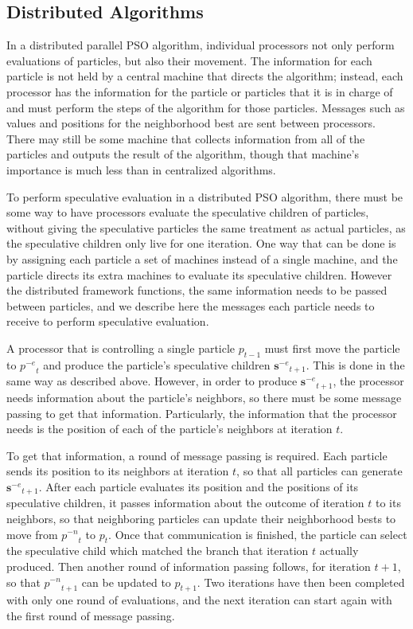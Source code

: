\documentclass[oneside,honors]{honors}
\providecommand{\noeval}[1]{\ensuremath{#1^{-e}}}
\providecommand{\nonbest}[1]{\ensuremath{#1^{-n}}}
\providecommand{\p}{\ensuremath{p}}
\providecommand{\sset}{\ensuremath{\mathbf{s}}}
\begin{document}
\subsection{Distributed Algorithms}

In a distributed parallel PSO algorithm, individual processors not only perform
evaluations of particles, but also their movement.  The information for each
particle is not held by a central machine that directs the algorithm; instead,
each processor has the information for the particle or particles that it is in
charge of and must perform the steps of the algorithm for those particles.
Messages such as values and positions for the neighborhood best are sent
between processors.  There may still be some machine that collects information
from all of the particles and outputs the result of the algorithm, though that
machine's importance is much less than in centralized algorithms.

To perform speculative evaluation in a distributed PSO algorithm, there must be
some way to have processors evaluate the speculative children of particles,
without giving the speculative particles the same treatment as actual
particles, as the speculative children only live for one iteration.  One way
that can be done is by assigning each particle a set of machines instead of a
single machine, and the particle directs its extra machines to evaluate its
speculative children.  However the distributed framework functions, the same
information needs to be passed between particles, and we describe here the
messages each particle needs to receive to perform speculative evaluation.

A processor that is controlling a single particle $\p_{t-1}$ must first move
the particle to $\noeval{\p}_t$ and produce the particle's speculative children
$\noeval{\sset}_{t+1}$.  This is done in the same way as described above.
However, in order to produce $\noeval{\sset}_{t+1}$, the processor needs
information about the particle's neighbors, so there must be some message
passing to get that information.  Particularly, the information that the
processor needs is the position of each of the particle's neighbors at
iteration $t$.

To get that information, a round of message passing is required.  Each particle
sends its position to its neighbors at iteration $t$, so that all particles can
generate $\noeval{\sset}_{t+1}$.  After each particle evaluates its position
and the positions of its speculative children, it passes information about the
outcome of iteration $t$ to its neighbors, so that neighboring particles can
update their neighborhood bests to move from $\nonbest{\p}_t$ to $\p_t$.  Once
that communication is finished, the particle can select the speculative child
which matched the branch that iteration $t$ actually produced.  Then another
round of information passing follows, for iteration $t+1$, so that
$\nonbest{\p}_{t+1}$ can be updated to $\p_{t+1}$.  Two iterations have then
been completed with only one round of evaluations, and the next iteration can
start again with the first round of message passing.
\end{document}

